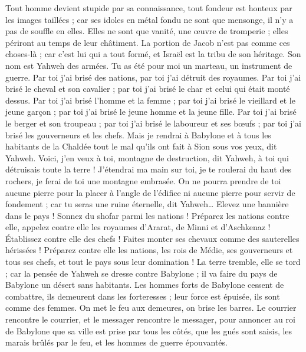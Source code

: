 \begin{multicols}{2}
Tout homme devient stupide par sa connaissance, tout fondeur est honteux par les images taillées ; car ses idoles en métal fondu ne sont que mensonge, il n'y a pas de souffle en elles.
Elles ne sont que vanité, une œuvre de tromperie ; elles périront au temps de leur châtiment.
La portion de Jacob n'est pas comme ces choses-là ; car c'est lui qui a tout formé, et Israël est la tribu de son héritage. Son nom est Yahweh des armées.
Tu as été pour moi un marteau, un instrument de guerre. Par toi j'ai brisé des nations, par toi j'ai détruit des royaumes.
Par toi j'ai brisé le cheval et son cavalier ; par toi j'ai brisé le char et celui qui était monté dessus.
Par toi j'ai brisé l'homme et la femme ; par toi j'ai brisé le vieillard et le jeune garçon ; par toi j'ai brisé le jeune homme et la jeune fille.
Par toi j'ai brisé le berger et son troupeau ; par toi j'ai brisé le laboureur et ses bœufs ; par toi j'ai brisé les gouverneurs et les chefs.
Mais je rendrai à Babylone et à tous les habitants de la Chaldée tout le mal qu'ils ont fait à Sion sous vos yeux, dit Yahweh.
Voici, j'en veux à toi, montagne de destruction, dit Yahweh, à toi qui détruisais toute la terre ! J'étendrai ma main sur toi, je te roulerai du haut des rochers, je ferai de toi une montagne embrasée.
On ne pourra prendre de toi aucune pierre pour la placer à l'angle de l'édifice ni aucune pierre pour servir de fondement ; car tu seras une ruine éternelle, dit Yahweh…
Elevez une bannière dans le pays ! Sonnez du shofar parmi les nations ! Préparez les nations contre elle, appelez contre elle les royaumes d'Ararat, de Minni et d'Aschkenaz ! Établissez contre elle des chefs ! Faites monter ses chevaux comme des sauterelles hérissées !
Préparez contre elle les nations, les rois de Médie, ses gouverneurs et tous ses chefs, et tout le pays sous leur domination !
La terre tremble, elle se tord ; car la pensée de Yahweh se dresse contre Babylone ; il va faire du pays de Babylone un désert sans habitants.
Les hommes forts de Babylone cessent de combattre, ils demeurent dans les forteresses ; leur force est épuisée, ils sont comme des femmes. On met le feu aux demeures, on brise les barres.
Le courrier rencontre le courrier, et le messager rencontre le messager, pour annoncer au roi de Babylone que sa ville est prise par tous les côtés,
que les gués sont saisis, les marais brûlés par le feu, et les hommes de guerre épouvantés.

\end{multicols}
